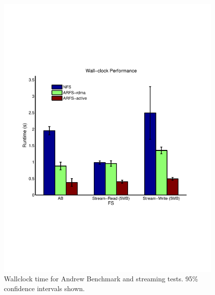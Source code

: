 \documentclass[10pt]{article}
\begin{document}
\begin{figure}
  \centering
\includegraphics[scale=0.5, trim = 0 200 0 200]{../../results/matlab/wallclock.pdf}
  \caption{Wallclock time for Andrew Benchmark and streaming tests. 95\% confidence intervals shown.}\label{wallclock}
\end{figure}
\end{document}
